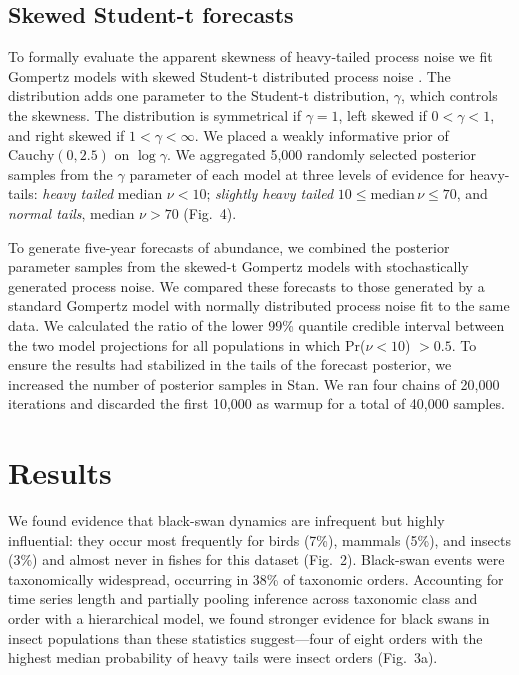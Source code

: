 \subsection{Skewed Student-t forecasts} To formally evaluate the apparent skewness
of heavy-tailed process noise we fit Gompertz models with skewed Student-t
distributed process noise \citep{fernandez1998}. The distribution adds one
parameter to the Student-t distribution, \(\gamma\), which controls the
skewness. The distribution is symmetrical if \(\gamma = 1\), left skewed if \(0
< \gamma < 1\), and right skewed if \(1 < \gamma < \infty\). We placed a weakly
informative prior of \(\mathrm{Cauchy}(0, 2.5)\) on \(\log \gamma\). We
aggregated 5,000 randomly selected posterior samples from the \(\gamma\)
parameter of each model at three levels of evidence for heavy-tails:
\emph{heavy tailed} median \(\nu < 10\); \emph{slightly heavy tailed} \(10 \le
\mathrm{median}\, \nu \le 70\), and \emph{normal tails}, median \(\nu > 70\)
(Fig.~4).

To generate five-year forecasts of abundance, we combined the posterior
parameter samples from the skewed-t Gompertz models with stochastically
generated process noise. We compared these forecasts to those generated by a
standard Gompertz model with normally distributed process noise fit to the same
data. We calculated the ratio of the lower 99\% quantile credible interval
between the two model projections for all populations in which Pr(\(\nu < 10\))
\(> 0.5\). To ensure the results had stabilized in the tails of the forecast
posterior, we increased the number of posterior samples in Stan. We ran four
chains of 20,000 iterations and discarded the first 10,000 as warmup for a
total of 40,000 samples.

\section{Results}

We found evidence that black-swan dynamics are infrequent but highly
influential: they occur most frequently for birds (7\%), mammals (5\%), and
insects (3\%) and almost never in fishes for this dataset (Fig.~2). Black-swan
events were taxonomically widespread, occurring in 38\% of taxonomic orders.
Accounting for time series length and partially pooling inference across
taxonomic class and order with a hierarchical model, we found stronger evidence
for black swans in insect populations than these statistics suggest---four of
eight orders with the highest median probability of heavy tails were insect
orders (Fig.~3a).

